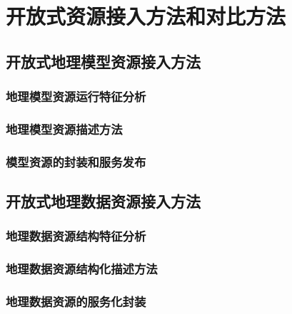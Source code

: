 \chapter{开放式资源接入方法和对比方法}

\section{开放式地理模型资源接入方法}

\subsection{地理模型资源运行特征分析}

\subsection{地理模型资源描述方法}
\subsection{模型资源的封装和服务发布}

\section{开放式地理数据资源接入方法}
\subsection{地理数据资源结构特征分析}
\subsection{地理数据资源结构化描述方法}
\subsection{地理数据资源的服务化封装}

